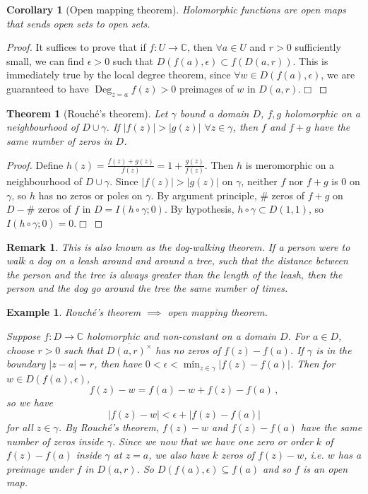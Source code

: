 \documentclass{article}
\theoremstyle{plain}\theoremheaderfont{\normalfont\itshape}\theorembodyfont{\rmfamily}\theoremseparator{.}\newtheorem*{rem}{Remark}\newtheorem*{ex}{Example}\newtheorem*{proof}{Proof}\newtheorem*{altp}{Alternative proof}\newtheorem*{con}{Consequences}\newtheorem*{notn}{Notations}\newtheorem*{cau}{Caution}\newtheorem*{term}{Terminology}\newtheorem*{keyex}{Key example}
\theoremstyle{plain}\theoremheaderfont{\normalfont\bfseries}\theorembodyfont{\rmfamily}\theoremseparator{.}\newtheorem{thm}{Theorem}[section]\newtheorem{lem}[thm]{Lemma}\newtheorem{prop}[thm]{Proposition}\newtheorem*{cor}{Corollary}\newtheorem{defn}[thm]{Definition}\newtheorem{clm}[thm]{Claim}\newtheorem{clminproof}{Claim}\newtheorem{leminproof}{Lemma}\newtheorem{app}{Application}
\theoremstyle{break}\theoremheaderfont{\normalfont\itshape}\theorembodyfont{\rmfamily}\theoremseparator{.\medskip}\newtheorem*{proofskip}{Proof}\newtheorem*{exs}{Examples}\newtheorem*{rems}{Remarks}\newtheorem*{rec}{Recall}\newtheorem*{ppts}{Properties}
\theoremstyle{break}\theoremheaderfont{\normalfont\bfseries}\theorembodyfont{\rmfamily}\theoremseparator{.\medskip}\newtheorem{lemskip}[thm]{Lemma}\newtheorem{defnskip}[thm]{Definition}\newtheorem{propskip}[thm]{Proposition}\newtheorem{thmskip}[thm]{Theorem}
\numberwithin{equation}{section}
\DeclareMathOperator*{\Deg}{Deg}
\newcommand{\qed}{\hfill\ensuremath{\Box}}
\newcommand{\abs}[1]{\left|#1\right|}
\newcommand{\CC}{\mathbb{C}}
\begin{document}
    \begin{cor}[Open mapping theorem]
        Holomorphic functions are \textit{open maps} that sends open sets to open sets.
    \end{cor}
    \begin{proof}
        It suffices to prove that if \(f:U\to\CC\), then \(\forall a\in U\) and \(r>0\) sufficiently small, we can find \(\epsilon>0\) such that \(D(f(a),\epsilon)\subset f(D(a,r))\). This is immediately true by the local degree theorem, since \(\forall w\in D(f(a),\epsilon)\), we are guaranteed to have \(\Deg_{z=a}f(z)>0\) preimages of \(w\) in \(D(a,r)\).\qed
    \end{proof}
    \begin{thm}[Rouch\'{e}'s theorem]
        Let \(\gamma\) bound a domain \(D\), \(f,g\) holomorphic on a neighbourhood of \(D\cup\gamma\). If \(\abs{f(z)}>\abs{g(z)}\) \(\forall z\in\gamma\), then \(f\) and \(f+g\) have the same number of zeros in \(D\).
    \end{thm}
    \begin{proof}
        Define \(h(z)=\frac{f(z)+g(z)}{f(z)}=1+\frac{g(z)}{f(z)}\). Then \(h\) is meromorphic on a neighbourhood of \(D\cup\gamma\). Since \(\abs{f(z)}>\abs{g(z)}\) on \(\gamma\), neither \(f\) nor \(f+g\) is \(0\) on \(\gamma\), so \(h\) has no zeros or poles on \(\gamma\). By argument principle, \# zeros of \(f+g\) on \(D-\#\) zeros of \(f\) in \(D=I(h\circ\gamma;0)\). By hypothesis, \(h\circ\gamma\subset D(1,1)\), so \(I(h\circ\gamma;0)=0\).\qed
    \end{proof}
    \begin{rem}
        This is also known as the dog-walking theorem. If a person were to walk a dog on a leash around and around a tree, such that the distance between the person and the tree is always greater than the length of the leash, then the person and the dog go around the tree the same number of times.
    \end{rem}
    \begin{ex}
        Rouch\'{e}'s theorem \(\implies\) open mapping theorem.

        Suppose \(f:D\to\CC\) holomorphic and non-constant on a domain \(D\). For \(a\in D\), choose \(r>0\) such that \(\overline{D(a,r)^\times}\) has no zeros of \(f(z)-f(a)\). If \(\gamma\) is in the boundary \(\abs{z-a}=r\), then have \(0<\epsilon<\min_{z\in\gamma}\abs{f(z)-f(a)}\). Then for \(w\in D(f(a),\epsilon)\),
        \[f(z)-w=f(a)-w+f(z)-f(a)\,,\]
        so we have
        \[\abs{f(z)-w}<\epsilon+\abs{f(z)-f(a)}\]
        for all \(z\in\gamma\). By Rouch\'{e}'s theorem, \(f(z)-w\) and \(f(z)-f(a)\) have the same number of zeros inside \(\gamma\). Since we now that we have one zero or order \(k\) of \(f(z)-f(a)\) inside \(\gamma\) at \(z=a\), we also have \(k\) zeros of \(f(z)-w\), i.e. \(w\) has a preimage under \(f\) in \(D(a,r)\). So \(D(f(a),\epsilon)\subseteq f(a)\) and so \(f\) is an open map. 
    \end{ex}
\end{document}
